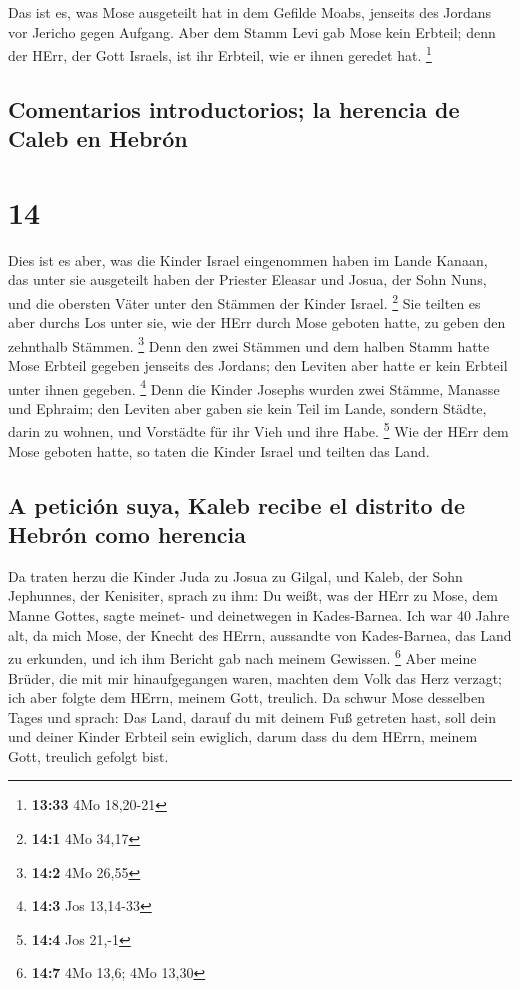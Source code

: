  Das ist es, was Mose ausgeteilt hat in dem Gefilde
Moabs, jenseits des Jordans vor Jericho gegen Aufgang. 
Aber dem Stamm Levi gab Mose kein Erbteil; denn der HErr, der Gott
Israels, ist ihr Erbteil, wie er ihnen geredet hat. \footnote{\textbf{13:33}
  4Mo 18,20-21}

\hypertarget{comentarios-introductorios-la-herencia-de-caleb-en-hebruxf3n}{%
\subsection{Comentarios introductorios; la herencia de Caleb en
Hebrón}\label{comentarios-introductorios-la-herencia-de-caleb-en-hebruxf3n}}

\hypertarget{section-13}{%
\section{14}\label{section-13}}

 Dies ist es aber, was die Kinder Israel eingenommen haben
im Lande Kanaan, das unter sie ausgeteilt haben der Priester Eleasar und
Josua, der Sohn Nuns, und die obersten Väter unter den Stämmen der
Kinder Israel. \footnote{\textbf{14:1} 4Mo 34,17}  Sie
teilten es aber durchs Los unter sie, wie der HErr durch Mose geboten
hatte, zu geben den zehnthalb Stämmen. \footnote{\textbf{14:2} 4Mo 26,55}
 Denn den zwei Stämmen und dem halben Stamm hatte Mose
Erbteil gegeben jenseits des Jordans; den Leviten aber hatte er kein
Erbteil unter ihnen gegeben. \footnote{\textbf{14:3} Jos 13,14-33}
 Denn die Kinder Josephs wurden zwei Stämme, Manasse und
Ephraim; den Leviten aber gaben sie kein Teil im Lande, sondern Städte,
darin zu wohnen, und Vorstädte für ihr Vieh und ihre Habe. \footnote{\textbf{14:4}
  Jos 21,-1}  Wie der HErr dem Mose geboten hatte, so
taten die Kinder Israel und teilten das Land.

\hypertarget{a-peticiuxf3n-suya-kaleb-recibe-el-distrito-de-hebruxf3n-como-herencia}{%
\subsection{A petición suya, Kaleb recibe el distrito de Hebrón como
herencia}\label{a-peticiuxf3n-suya-kaleb-recibe-el-distrito-de-hebruxf3n-como-herencia}}

 Da traten herzu die Kinder Juda zu Josua zu Gilgal, und
Kaleb, der Sohn Jephunnes, der Kenisiter, sprach zu ihm: Du weißt, was
der HErr zu Mose, dem Manne Gottes, sagte meinet- und deinetwegen in
Kades-Barnea.  Ich war 40 Jahre alt, da mich Mose, der
Knecht des HErrn, aussandte von Kades-Barnea, das Land zu erkunden, und
ich ihm Bericht gab nach meinem Gewissen. \footnote{\textbf{14:7} 4Mo
  13,6; 4Mo 13,30}  Aber meine Brüder, die mit mir
hinaufgegangen waren, machten dem Volk das Herz verzagt; ich aber folgte
dem HErrn, meinem Gott, treulich.  Da schwur Mose
desselben Tages und sprach: Das Land, darauf du mit deinem Fuß getreten
hast, soll dein und deiner Kinder Erbteil sein ewiglich, darum dass du
dem HErrn, meinem Gott, treulich gefolgt bist.

